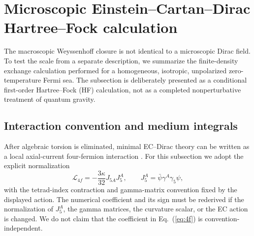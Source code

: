 \documentclass[11pt]{article}
\begin{document}
\section{Microscopic Einstein--Cartan--Dirac Hartree--Fock calculation}
The macroscopic Weyssenhoff closure is not identical to a microscopic Dirac field. To test the scale from a separate description, we summarize the finite-density exchange calculation performed for a homogeneous, isotropic, unpolarized zero-temperature Fermi sea. The subsection is deliberately presented as a conditional first-order Hartree--Fock (HF) calculation, not as a completed nonperturbative treatment of quantum gravity.

\subsection{Interaction convention and medium integrals}
After algebraic torsion is eliminated, minimal EC--Dirac theory can be written as a local axial-current four-fermion interaction \cite{Hehl1976,Shapiro2002,Poplawski2012}. For this subsection we adopt the explicit normalization
\begin{equation}
\mathcal L_{4f}=-\frac{3\kappa}{32}J_{5A}J_5^{A},
\qquad J_5^A=\bar\psi\gamma^A\gamma_5\psi,
\label{eq:4f}
\end{equation}
with the tetrad-index contraction and gamma-matrix convention fixed by the displayed action. The numerical coefficient and its sign must be rederived if the normalization of $J_5^A$, the gamma matrices, the curvature scalar, or the EC action is changed. We do not claim that the coefficient in Eq.~(\ref{eq:4f}) is convention-independent.
\end{document}
